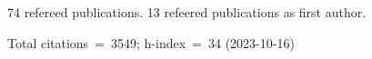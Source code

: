 74 refereed publications. 13 refeered publications as first author.

Total citations~=~3549; h-index~=~34 (2023-10-16)